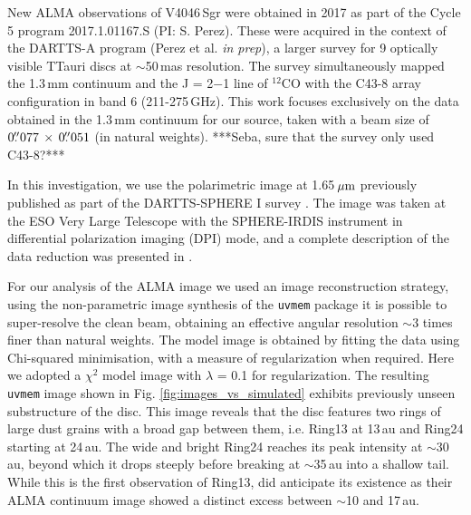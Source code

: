 \documentclass[letters,usenatbib,times]{mnras}
\begin{document}

New ALMA observations of V4046\,Sgr were obtained in 2017 as part of the Cycle 5 program 2017.1.01167.S (PI: S. Perez). These were acquired in the context of the DARTTS-A program (Perez et al. {\em in prep}), a larger survey for 9 optically visible TTauri discs at $\sim$50\,mas resolution. The survey simultaneously mapped the 1.3\,mm continuum and the J = 2$-$1 line of $^{12}$CO with the C43-8 array configuration in band 6 (211-275\,GHz). This work focuses exclusively on the data obtained in the 1.3\,mm continuum for our source, taken with a beam size of $0\hbox{$.\!\!^{\prime\prime}$}077 \,\times \, 0\hbox{$.\!\!^{\prime\prime}$}051$ (in natural weights). ***Seba, sure that the survey only used C43-8?***

In this investigation, we use the polarimetric image at 1.65\,$\hbox{$\mu$m}$ previously published as part of the DARTTS-SPHERE I survey \citep{Avenhaus_2018}. The image was taken at the ESO Very Large Telescope with the SPHERE-IRDIS instrument in differential polarization imaging (DPI) mode, and a complete description of the data reduction was presented in \citet{Avenhaus_2018}. 

For our analysis of the ALMA image we used an image reconstruction strategy, using the non-parametric image synthesis of the {\tt uvmem} package \citep{2006ApJ...639..951C, 2018A&C....22...16C} it is possible to super-resolve the clean beam, obtaining an effective angular resolution $\sim$3 times finer than natural weights. The model image is obtained by fitting the data using Chi-squared minimisation, with a measure of regularization when required. Here we adopted a $\chi^2$ model image with $\lambda$ = 0.1 for regularization. The resulting {\tt uvmem} image shown in Fig. \ref{fig:images_vs_simulated} exhibits previously unseen substructure of the disc. This image reveals that the disc features two rings of large dust grains with a broad gap between them, i.e. Ring13 at 13\,au and Ring24 starting at 24\,au. The wide and bright Ring24 reaches its peak intensity at $\sim$30\,au, beyond which it drops steeply before breaking at $\sim$35\,au into a shallow tail. While this is the first observation of Ring13, \citet{Ru_z_Rodr_guez_2019} did anticipate its existence as their ALMA continuum image showed a distinct excess between
$\sim$10 and 17\,au.
\end{document}
